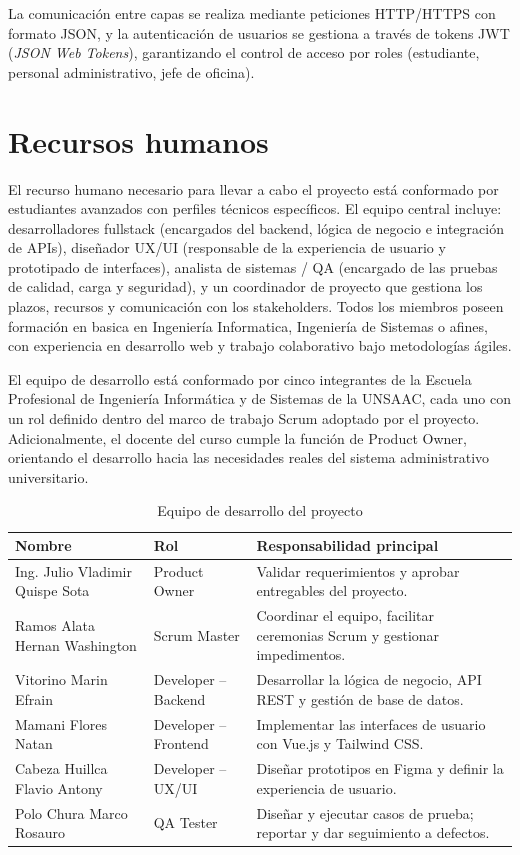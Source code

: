 La comunicación entre capas se realiza mediante peticiones HTTP/HTTPS con formato JSON,
y la autenticación de usuarios se gestiona a través de tokens JWT (\textit{JSON Web Tokens}),
garantizando el control de acceso por roles (estudiante, personal administrativo, jefe de
oficina).

\section{Recursos humanos}
El recurso humano necesario para llevar a cabo el proyecto está conformado por  estudiantes 
avanzados con perfiles técnicos específicos. El equipo central incluye: desarrolladores fullstack 
(encargados del backend, lógica de negocio e integración de APIs), diseñador UX/UI (responsable 
de la experiencia de usuario y prototipado de interfaces), analista de sistemas / QA (encargado 
de las pruebas de calidad, carga y seguridad), y un coordinador de proyecto que gestiona los plazos,
recursos y comunicación con los stakeholders. Todos los miembros poseen formación en basica en Ingeniería Informatica, 
Ingeniería de Sistemas o afines, con experiencia en desarrollo web y trabajo colaborativo bajo metodologías ágiles.
\lipsum[1]



El equipo de desarrollo está conformado por cinco integrantes de la Escuela Profesional de
Ingeniería Informática y de Sistemas de la UNSAAC, cada uno con un rol definido dentro del
marco de trabajo Scrum adoptado por el proyecto. Adicionalmente, el docente del curso cumple
la función de Product Owner, orientando el desarrollo hacia las necesidades reales del sistema
administrativo universitario.


\begin{table}[H]
\centering
\caption{Equipo de desarrollo del proyecto}
\label{tab:equipo_humano}
\begin{tabular}{|p{5cm}|p{3.5cm}|p{5.5cm}|}
\hline
\textbf{Nombre} & \textbf{Rol} & \textbf{Responsabilidad principal} \\
\hline
Ing. Julio Vladimir Quispe Sota & Product Owner &
Validar requerimientos y aprobar entregables del proyecto. \\
\hline
Ramos Alata Hernan Washington & Scrum Master &
Coordinar el equipo, facilitar ceremonias Scrum y gestionar impedimentos. \\
\hline
Vitorino Marin Efrain & Developer – Backend &
Desarrollar la lógica de negocio, API REST y gestión de base de datos. \\
\hline
Mamani Flores Natan & Developer – Frontend &
Implementar las interfaces de usuario con Vue.js y Tailwind CSS. \\
\hline
Cabeza Huillca Flavio Antony & Developer – UX/UI &
Diseñar prototipos en Figma y definir la experiencia de usuario. \\
\hline
Polo Chura Marco Rosauro & QA Tester &
Diseñar y ejecutar casos de prueba; reportar y dar seguimiento a defectos. \\
\hline
\end{tabular}
\end{table}

